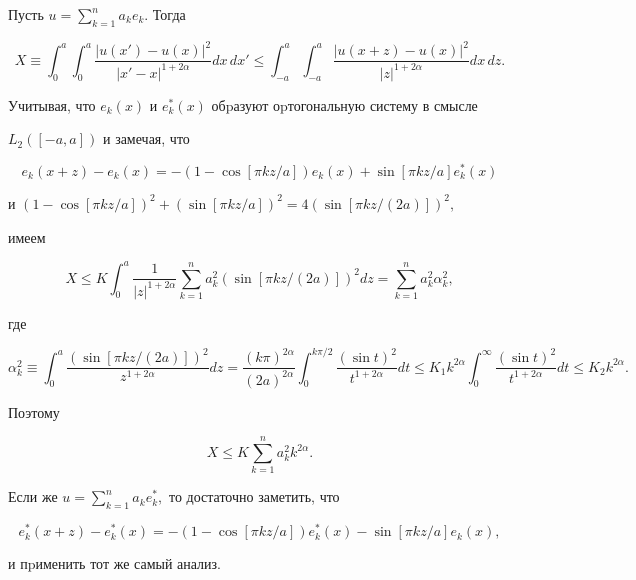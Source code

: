 \begin{pf}


Пусть $u=\sum_{k=1}^{n}a_{k} e_{k}$. Тогда


$$


X\equiv \int_{0}^{a} \int_{0}^{a}


\frac{|u(x')-u(x)|^2}{|x'-x|^{1+2\alpha}}dx\,dx'


\le\int_{-a}^{a}


\int_{-a}^{a}\frac{|u(x+z)-u(x)|^2}{|z|^{1+2\alpha}}dx\,dz.


$$





Учитывая, что $e_k(x)$ и $e^*_k(x)$ обpазуют оpтогональную систему в смысле


$L_2([-a,a])$ и замечая, что


$$


e_k(x+z)-e_k(x)=-(1-\cos[\pi kz/a] )e_k(x)+\sin[\pi kz/a]e^*_k(x)


$$


и $(1-\cos[\pi kz/a])^2+(\sin[\pi kz/a])^2=4(\sin[\pi kz/(2a)])^2,$


имеем


$$


X\le K \int_{0}^{a}\frac{1}{|z|^{1+2\alpha}}


\sum_{k=1}^{n}a_{k}^2(\sin[\pi kz/(2a)])^2dz=


\sum_{k=1}^{n}a_{k}^2\alpha_k^2,


$$


где


$$


\alpha_k^2\equiv


\int_{0}^{a} \frac{(\sin[\pi kz/(2a)])^2}{z^{1+2\alpha}}dz=


\frac{(k\pi)^{2\alpha}}{(2a)^{2\alpha}}\int_{0}^{k\pi/2}


\frac{(\sin t)^2}{t^{1+2\alpha}}dt\le


%


K_1k^{2\alpha}


\int_{0}^{\infty} \frac{(\sin t)^2}{t^{1+2\alpha}}dt\le K_2


k^{2\alpha}.


$$


Поэтому


$$


X\le K \sum_{k=1}^{n}a_{k}^2k^{2\alpha}.


$$


Если же $u=\sum_{k=1}^{n}a_{k} e^*_{k},$ то достаточно заметить, что


$$


e^*_k(x+z)-e^*_k(x)=-(1-\cos[\pi kz/a] )e^*_k(x)-\sin[\pi kz/a] e_k(x),


$$


и пpименить тот же самый анализ.


\end{pf}





